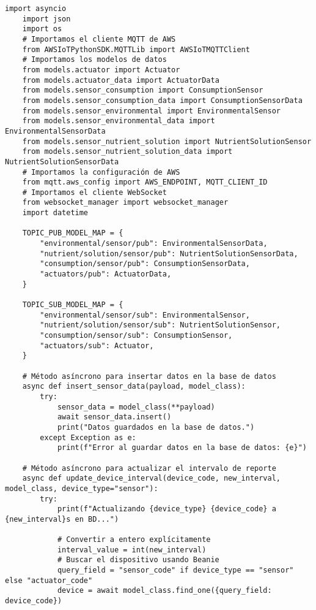 
\begin{lstlisting}[label=cod:mqtt_connection,caption=Definición de Clase para cliente MQTT., language=PythonUTF8]
    import asyncio
    import json
    import os
    # Importamos el cliente MQTT de AWS
    from AWSIoTPythonSDK.MQTTLib import AWSIoTMQTTClient
    # Importamos los modelos de datos
    from models.actuator import Actuator
    from models.actuator_data import ActuatorData
    from models.sensor_consumption import ConsumptionSensor
    from models.sensor_consumption_data import ConsumptionSensorData
    from models.sensor_environmental import EnvironmentalSensor
    from models.sensor_environmental_data import EnvironmentalSensorData
    from models.sensor_nutrient_solution import NutrientSolutionSensor
    from models.sensor_nutrient_solution_data import NutrientSolutionSensorData
    # Importamos la configuración de AWS
    from mqtt.aws_config import AWS_ENDPOINT, MQTT_CLIENT_ID
    # Importamos el cliente WebSocket
    from websocket_manager import websocket_manager
    import datetime

    TOPIC_PUB_MODEL_MAP = {
        "environmental/sensor/pub": EnvironmentalSensorData,
        "nutrient/solution/sensor/pub": NutrientSolutionSensorData,
        "consumption/sensor/pub": ConsumptionSensorData,
        "actuators/pub": ActuatorData,
    }

    TOPIC_SUB_MODEL_MAP = {
        "environmental/sensor/sub": EnvironmentalSensor,
        "nutrient/solution/sensor/sub": NutrientSolutionSensor,
        "consumption/sensor/sub": ConsumptionSensor,
        "actuators/sub": Actuator,
    }

    # Método asíncrono para insertar datos en la base de datos
    async def insert_sensor_data(payload, model_class):
        try:
            sensor_data = model_class(**payload)
            await sensor_data.insert()
            print("Datos guardados en la base de datos.")
        except Exception as e:
            print(f"Error al guardar datos en la base de datos: {e}")

    # Método asíncrono para actualizar el intervalo de reporte
    async def update_device_interval(device_code, new_interval, model_class, device_type="sensor"):
        try:
            print(f"Actualizando {device_type} {device_code} a {new_interval}s en BD...")
            
            # Convertir a entero explícitamente
            interval_value = int(new_interval)
            # Buscar el dispositivo usando Beanie
            query_field = "sensor_code" if device_type == "sensor" else "actuator_code"
            device = await model_class.find_one({query_field: device_code})
            

\end{lstlisting}
